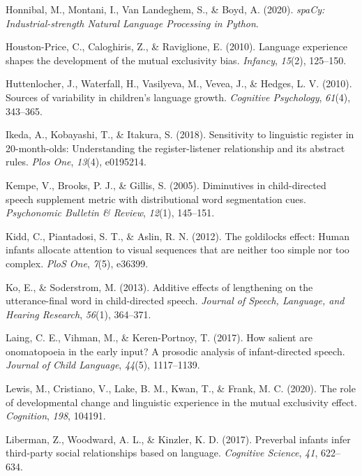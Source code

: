 \documentclass[10pt, letterpaper]{article}
\newenvironment{CSLReferences}%
  {}%
  {\par}
\begin{document}
\begin{CSLReferences}
\leavevmode\hypertarget{ref-honnibal2020spacy}{}%
Honnibal, M., Montani, I., Van Landeghem, S., \& Boyd, A. (2020).
\emph{{spaCy: Industrial-strength Natural Language Processing in
Python}}.

\leavevmode\hypertarget{ref-houston2010language}{}%
Houston-Price, C., Caloghiris, Z., \& Raviglione, E. (2010). Language
experience shapes the development of the mutual exclusivity bias.
\emph{Infancy}, \emph{15}(2), 125--150.

\leavevmode\hypertarget{ref-huttenlocher2010sources}{}%
Huttenlocher, J., Waterfall, H., Vasilyeva, M., Vevea, J., \& Hedges, L.
V. (2010). Sources of variability in children's language growth.
\emph{Cognitive Psychology}, \emph{61}(4), 343--365.

\leavevmode\hypertarget{ref-ikeda2018sensitivity}{}%
Ikeda, A., Kobayashi, T., \& Itakura, S. (2018). Sensitivity to
linguistic register in 20-month-olds: Understanding the
register-listener relationship and its abstract rules. \emph{Plos One},
\emph{13}(4), e0195214.

\leavevmode\hypertarget{ref-kempe2005diminutives}{}%
Kempe, V., Brooks, P. J., \& Gillis, S. (2005). Diminutives in
child-directed speech supplement metric with distributional word
segmentation cues. \emph{Psychonomic Bulletin \& Review}, \emph{12}(1),
145--151.

\leavevmode\hypertarget{ref-kidd2012goldilocks}{}%
Kidd, C., Piantadosi, S. T., \& Aslin, R. N. (2012). The goldilocks
effect: Human infants allocate attention to visual sequences that are
neither too simple nor too complex. \emph{PloS One}, \emph{7}(5),
e36399.

\leavevmode\hypertarget{ref-ko2013additive}{}%
Ko, E., \& Soderstrom, M. (2013). Additive effects of lengthening on the
utterance-final word in child-directed speech. \emph{Journal of Speech,
Language, and Hearing Research}, \emph{56}(1), 364--371.

\leavevmode\hypertarget{ref-laing2017salient}{}%
Laing, C. E., Vihman, M., \& Keren-Portnoy, T. (2017). How salient are
onomatopoeia in the early input? A prosodic analysis of infant-directed
speech. \emph{Journal of Child Language}, \emph{44}(5), 1117--1139.

\leavevmode\hypertarget{ref-lewis2020role}{}%
Lewis, M., Cristiano, V., Lake, B. M., Kwan, T., \& Frank, M. C. (2020).
The role of developmental change and linguistic experience in the mutual
exclusivity effect. \emph{Cognition}, \emph{198}, 104191.

\leavevmode\hypertarget{ref-liberman2017preverbal}{}%
Liberman, Z., Woodward, A. L., \& Kinzler, K. D. (2017). Preverbal
infants infer third-party social relationships based on language.
\emph{Cognitive Science}, \emph{41}, 622--634.


\end{CSLReferences}
\end{document}
